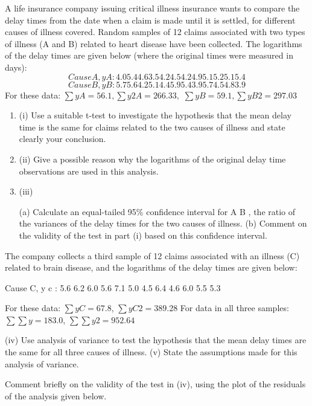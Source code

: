 \documentclass[a4paper,12pt]{article}
\begin{document}
A life insurance company issuing critical illness insurance wants to compare the delay times from the date when a claim is made until it is settled, for different causes of
illness covered. Random samples of 12 claims associated with two types of illness (A and B) related to heart disease have been collected. The logarithms of the delay times
are given below (where the original times were measured in days):
\[Cause A, y A : 4.0 5.4 4.6 3.5 4.2 4.5 4.2 4.9 5.1 5.2 5.1 5.4\]
\[Cause B, y B : 5.7 5.6 4.2 5.1 4.4 5.9 5.4 3.9 5.7 4.5 4.8 3.9\]
For these data:
$\sum y A = 56.1, \sum y 2 A = 266.33,$
$\sum y B = 59.1, \sum y B 2 = 297.03$
\begin{enumerate}
\item 
(i) Use a suitable t-test to investigate the hypothesis that the mean delay time is the same for claims related to the two causes of illness and state clearly your
conclusion.
\item 
(ii) Give a possible reason why the logarithms of the original delay time observations are used in this analysis.
\item (iii)

(a) Calculate an equal-tailed 95\% confidence interval for  A  B , the
ratio of the variances of the delay times for the two causes of illness.
(b) Comment on the validity of the test in part (i) based on this confidence
interval.
\end{enumerate}


\item The company collects a third sample of 12 claims associated with an illness (C) related to brain disease, and the logarithms of the delay times are given below:

Cause C, y c : 5.6 6.2 6.0 5.6 7.1 5.0 4.5 6.4 4.6 6.0 5.5 5.3

For these data:
$\sum y C = 67.8$, $\sum y C 2 = 389.28$
For data in all three samples:
$\sum\sum y = 183.0$, $\sum\sum y 2 = 952.64$

(iv) Use analysis of variance to test the hypothesis that the mean delay times are the same for all three causes of illness.
(v) State the assumptions made for this analysis of variance.

Comment briefly on the validity of the test in (iv), using the plot of the
residuals of the analysis given below.
\end{document}
